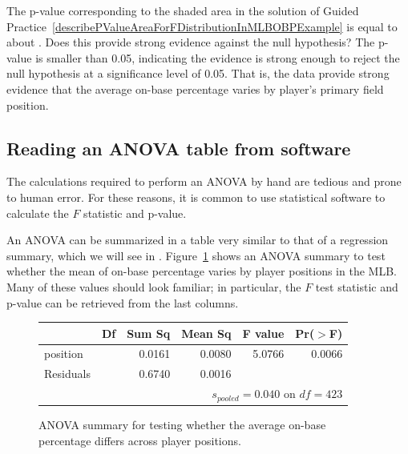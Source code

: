 \begin{examplewrap}
\begin{nexample}{The p-value corresponding to the shaded area in the solution of Guided Practice~\ref{describePValueAreaForFDistributionInMLBOBPExample} is equal to about \mlbPvalue{}. Does this provide strong evidence against the null hypothesis?}
The p-value is smaller than 0.05, indicating the evidence is strong enough to reject the null hypothesis at a significance level of 0.05. That is, the data provide strong evidence that the average on-base percentage varies by player's primary field position.
\end{nexample}
\end{examplewrap}


\subsection{Reading an ANOVA table from software}

The calculations required to perform an ANOVA by hand are tedious and prone to human error. For these reasons, it is common to use statistical software to calculate the $F$ statistic and p-value.

An ANOVA can be summarized in a table very similar to that of a regression summary, which we will see in . Figure~\ref{anovaSummaryTableForOBPAgainstPosition} shows an ANOVA summary to test whether the mean of on-base percentage varies by player positions in the MLB. Many of these values should look familiar; in particular, the $F$ test statistic and p-value can be retrieved from the last columns.

\begin{figure}[ht]
\centering
\begin{tabular}{lrrrrr}
  \hline
  & Df & Sum Sq & Mean Sq & F value & Pr($>$F) \\ 
  \hline
  position & \mlbDFA{} & 0.0161 & 0.0080 & 5.0766 & 0.0066 \\ 
  Residuals & \mlbDFB{} & 0.6740 & 0.0016 &  &  \\ 

  \hline
\multicolumn{6}{r}{$s_{pooled} = 0.040$ on $df = 423$}
\end{tabular}
\caption{ANOVA summary for testing whether the average on-base percentage differs across player positions.}
\label{anovaSummaryTableForOBPAgainstPosition}
\end{figure}


